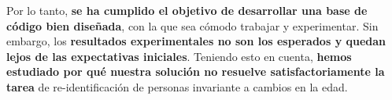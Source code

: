 Por lo tanto, \textbf{se ha cumplido el objetivo de desarrollar una base de código bien diseñada}, con la que sea cómodo trabajar y experimentar. Sin embargo, los \textbf{resultados experimentales no son los esperados y quedan lejos de las expectativas iniciales}. Teniendo esto en cuenta, \textbf{hemos estudiado por qué nuestra solución no resuelve satisfactoriamente la tarea} de re-identificación de personas invariante a cambios en la edad.


\endinput
